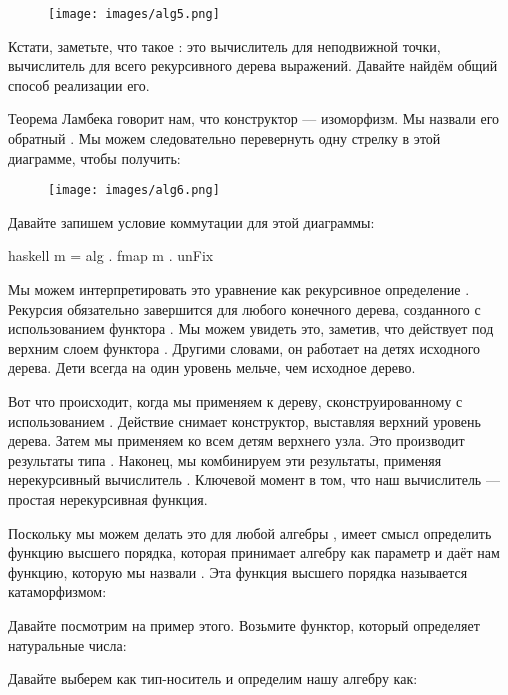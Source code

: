 \begin{figure}[H]
  \centering
  \texttt{[image: images/alg5.png]}
\end{figure}

\noindent
Кстати, заметьте, что такое : это вычислитель для неподвижной
точки, вычислитель для всего рекурсивного дерева выражений. Давайте найдём
общий способ реализации его.

Теорема Ламбека говорит нам, что конструктор  ---
изоморфизм. Мы назвали его обратный . Мы можем следовательно перевернуть
одну стрелку в этой диаграмме, чтобы получить:

\begin{figure}[H]
  \centering
  \texttt{[image: images/alg6.png]}
\end{figure}

\noindent
Давайте запишем условие коммутации для этой диаграммы:

\begin{snip}{haskell}
m = alg . fmap m . unFix
\end{snip}
Мы можем интерпретировать это уравнение как рекурсивное определение .
Рекурсия обязательно завершится для любого конечного дерева, созданного с использованием
функтора . Мы можем увидеть это, заметив, что
 действует под верхним слоем функтора
. Другими словами, он работает на детях исходного
дерева. Дети всегда на один уровень мельче, чем исходное
дерево.

Вот что происходит, когда мы применяем  к дереву, сконструированному с использованием
. Действие  снимает конструктор,
выставляя верхний уровень дерева. Затем мы применяем  ко всем
детям верхнего узла. Это производит результаты типа .
Наконец, мы комбинируем эти результаты, применяя нерекурсивный
вычислитель . Ключевой момент в том, что наш вычислитель 
--- простая нерекурсивная функция.

Поскольку мы можем делать это для любой алгебры , имеет смысл
определить функцию высшего порядка, которая принимает алгебру как параметр и
даёт нам функцию, которую мы назвали . Эта функция высшего порядка
называется катаморфизмом:

Давайте посмотрим на пример этого. Возьмите функтор, который определяет натуральные
числа:

Давайте выберем  как тип-носитель и определим нашу
алгебру как:

